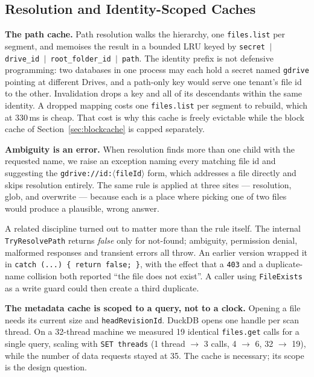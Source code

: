 \documentclass[sigconf, nonacm]{acmart}
\begin{document}
\subsection{Resolution and Identity-Scoped Caches}
\label{sec:resolution}

\textbf{The path cache.}
Path resolution walks the hierarchy, one \texttt{files.list} per segment, and
memoises the result in a bounded LRU keyed by
\texttt{secret\,$\vert$\,drive\_id\,$\vert$\,root\_folder\_id\,$\vert$\,path}.
The identity prefix is not defensive programming: two databases in one process
may each hold a secret named \texttt{gdrive} pointing at different Drives, and
a path-only key would serve one tenant's file id to the other. Invalidation
drops a key and all of its descendants within the same identity. A dropped
mapping costs one \texttt{files.list} per segment to rebuild, which at 330\,ms
is cheap. That cost is why this cache is freely evictable while the block
cache of Section~\ref{sec:blockcache} is capped separately.

\textbf{Ambiguity is an error.}
When resolution finds more than one child with the requested name, we raise an
exception naming every matching file id and suggesting the
\texttt{gdrive://id:$\langle$fileId$\rangle$} form, which addresses a file
directly and skips resolution entirely. The same rule is applied at three
sites --- resolution, glob, and overwrite --- because each is a place where
picking one of two files would produce a plausible, wrong answer.

A related discipline turned out to matter more than the rule itself. The
internal \texttt{TryResolvePath} returns \emph{false} only for not-found;
ambiguity, permission denial, malformed responses and transient errors all
throw. An earlier version wrapped it in \texttt{catch (...) \{ return false;
\}}, with the effect that a \texttt{403} and a duplicate-name collision both
reported ``the file does not exist''. A caller using \texttt{FileExists} as a
write guard could then create a third duplicate.

\textbf{The metadata cache is scoped to a query, not to a clock.}
Opening a file needs its current size and \texttt{headRevisionId}. DuckDB
opens one handle per scan thread. On a 32-thread machine we measured 19
identical \texttt{files.get} calls for a single query, scaling with
\texttt{SET threads} (1 thread $\rightarrow$ 3 calls, 4 $\rightarrow$ 6,
32 $\rightarrow$ 19), while the number of data requests stayed at 35. The cache
is necessary; its scope is the design question.
\end{document}
